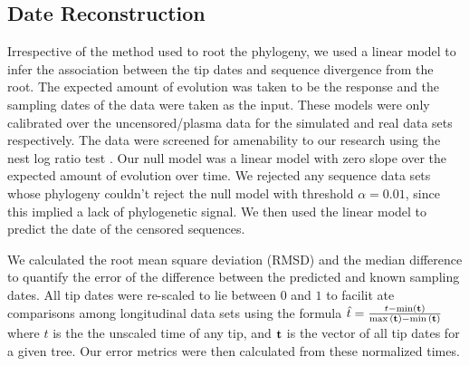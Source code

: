\documentclass[12pt]{article}
\begin{document}
\subsection * {Date Reconstruction} \label{subsec:daterecon}

Irrespective of the method used to root the phylogeny, we used a linear model to infer the association between the tip dates and sequence divergence from the root. 
The expected amount of evolution was taken to be the response and the sampling dates of the data were taken as the input. 
These models were only calibrated over the uncensored/plasma data for the simulated and real data sets respectively.
The data were screened for amenability to our research using the nest log ratio test \citep{Ho14}. 
Our null model was a linear model with zero slope over the expected amount of evolution over time.
We rejected any sequence data sets whose phylogeny couldn't reject the null model with threshold $\alpha=0.01$, since this implied a lack of phylogenetic signal. We then used the linear model to predict the date of the censored sequences.

We calculated the root mean square deviation (RMSD) and the median difference to quantify the error of the difference between the predicted and known sampling dates.
All tip dates were re-scaled to lie between $0$ and $1$ to facilit      ate comparisons among longitudinal data sets using the formula $ \hat{t} = \frac{t - \min(\bf{t}) }{ \max{(\bf{t})} - \min{(\bf{t}})}$ where $t$ is the the unscaled time of any tip, and $\bf{t}$ is the vector of all tip dates for a given tree. 
Our error metrics were then calculated from these normalized times.%
\end{document}
